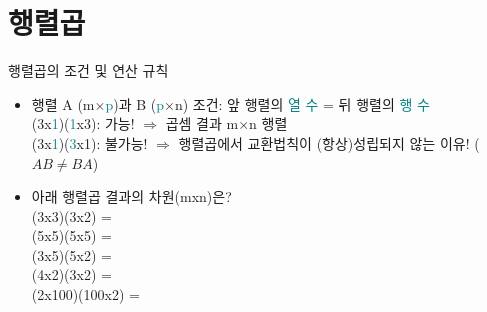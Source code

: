 \documentclass[aspectratio=169]{beamer}
\begin{document}
\section{행렬곱}
\begin{frame}{행렬곱의 조건 및 연산 규칙}
\begin{itemize}
    \item 행렬 A (m×\textcolor{teal}{p})과 B (\textcolor{teal}{p}×n) 조건: 앞 행렬의 \textcolor{teal}{열 수} = 뒤 행렬의 \textcolor{teal}{행 수} \\
       (3x\textcolor{teal}{1})(\textcolor{teal}{1}x3): 가능! $\Rightarrow$ 곱셈 결과 m×n 행렬 \\
       (3x\textcolor{teal}{1})(\textcolor{teal}{3}x1): 불가능! $\Rightarrow$ 행렬곱에서 교환법칙이 (항상)성립되지 않는 이유! ($AB \neq BA$)\\
    \item 아래 행렬곱 결과의 차원(mxn)은?
       \\ (3x3)(3x2) =
       \\ (5x5)(5x5) =
       \\ (3x5)(5x2) =
       \\ (4x2)(3x2) =
       \\ (2x100)(100x2) =
\end{itemize}
\end{frame}
\end{document}
